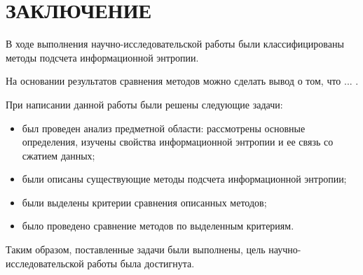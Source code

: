 \chapter*{ЗАКЛЮЧЕНИЕ}

В ходе выполнения научно-исследовательской работы были классифицированы методы подсчета информационной энтропии.

На основании результатов сравнения методов можно сделать вывод о том, что ... .

При написании данной работы были решены следующие задачи:

\begin{itemize}
	\item был проведен анализ предметной области: рассмотрены основные определения, изучены свойства информационной энтропии и ее связь со сжатием данных;
	\item были описаны существующие методы подсчета информационной энтропии;
	\item были выделены критерии сравнения описанных методов;
	\item было проведено сравнение методов по выделенным критериям.
\end{itemize}

Таким образом, поставленные задачи были выполнены, цель научно-исследовательской работы была достигнута.